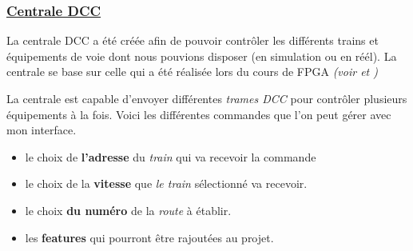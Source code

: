 \subsubsection{\underline{Centrale DCC}}
\label{sec:Centrale}

La centrale DCC a été créée afin de pouvoir contrôler les
différents trains et équipements de voie dont nous pouvions
disposer (en simulation ou en réél). La centrale se base sur celle qui a été réalisée lors du cours de FPGA  \emph{(voir \cite{rapport} et \cite{sujet})}

La centrale est capable d'envoyer différentes \emph{trames DCC}
pour contrôler plusieurs équipements à la fois. Voici les différentes
commandes que l'on peut gérer avec mon interface.


\begin{itemize}
    \item le choix de \textbf{l'adresse} du \emph{train} qui va
      recevoir la commande
    \item le choix de la \textbf{vitesse} que \emph{le train} s\'electionn\'e
      va recevoir. 
    \item le choix  \textbf{du numéro} de la \emph{route} \`a \'etablir.
    \item les \textbf{features} qui pourront \^etre rajout\'ees au
      projet. 
  \end{itemize}

\newpage

